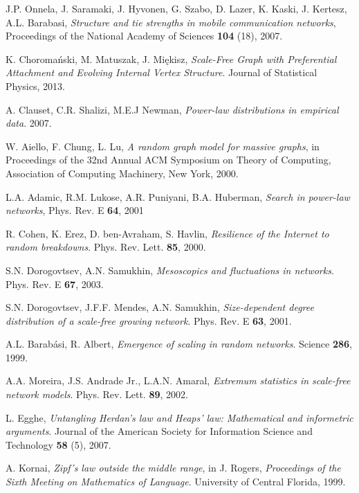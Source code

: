 \begin{thebibliography}{99}
  J.P. Onnela, J. Saramaki, J. Hyvonen, G. Szabo, D. Lazer, K. Kaski, J. Kertesz, A.L. Barabasi,
  \emph{Structure and tie strengths in mobile communication networks},
  Proceedings of the National Academy of Sciences \textbf{104} (18),
  2007.

  K. Choromański, M. Matuszak, J. Miękisz,
  \emph{Scale-Free Graph with Preferential Attachment and Evolving Internal Vertex Structure}.
  Journal of Statistical Physics,
  2013.

  A. Clauset, C.R. Shalizi, M.E.J Newman,
  \emph{Power-law distributions in empirical data}.
  2007.

  W. Aiello, F. Chung, L. Lu,
  \emph{A random graph model for massive graphs},
  in Proceedings of the 32nd Annual ACM Symposium on Theory of Computing,
  Association of Computing Machinery, New York,
  2000.

  L.A. Adamic, R.M. Lukose, A.R. Puniyani, B.A. Huberman,
  \emph{Search in power-law networks},
  Phys. Rev. E \textbf{64},
  2001

  R. Cohen, K. Erez, D. ben-Avraham, S. Havlin,
  \emph{Resilience of the Internet to random breakdowns}.
  Phys. Rev. Lett. \textbf{85},
  2000.

  S.N. Dorogovtsev, A.N. Samukhin,
  \emph{Mesoscopics and fluctuations in networks}.
  Phys. Rev. E \textbf{67},
  2003.

  S.N. Dorogovtsev, J.F.F. Mendes, A.N. Samukhin,
  \emph{Size-dependent degree distribution of a scale-free growing network}.
  Phys. Rev. E \textbf{63},
  2001.

  A.L. Barabási, R. Albert,
  \emph{Emergence of scaling in random networks}.
  Science \textbf{286},
  1999.
  
  A.A. Moreira, J.S. Andrade Jr., L.A.N. Amaral,
  \emph{Extremum statistics in scale-free network models}.
  Phys. Rev. Lett. \textbf{89},
  2002.
  
  L. Egghe,
  \emph{Untangling Herdan's law and Heaps' law: Mathematical and informetric arguments}.
  Journal of the American Society for Information Science and Technology \textbf{58} (5),
  2007.

  A. Kornai,
  \emph{Zipf's law outside the middle range}, in J. Rogers, \emph{Proceedings of the Sixth Meeting on Mathematics of Language}.
  University of Central Florida,
  1999.


\end{thebibliography}

